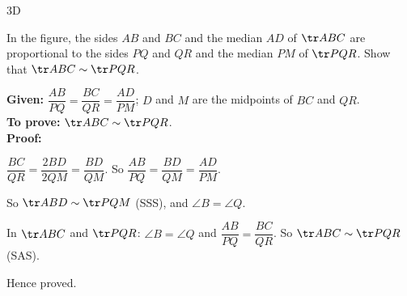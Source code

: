 \begin{exercise}{3D}
\item In the figure, the sides $AB$ and $BC$ and the median $AD$ of $\tr ABC$ are proportional to the sides $PQ$ and $QR$ and the median $PM$ of $\tr PQR$. Show that $\tr ABC\sim\tr PQR$.
\begin{solution}
\textbf{Given:} $\dfrac{AB}{PQ}=\dfrac{BC}{QR}=\dfrac{AD}{PM}$; $D$ and $M$ are the midpoints of $BC$ and $QR$.\\
\textbf{To prove:} $\tr ABC\sim\tr PQR$.\\
\textbf{Proof:}
\begin{steps}
  \item $\dfrac{BC}{QR}=\dfrac{2BD}{2QM}=\dfrac{BD}{QM}$. So $\dfrac{AB}{PQ}=\dfrac{BD}{QM}=\dfrac{AD}{PM}$.
  \item So $\tr ABD\sim\tr PQM$ (SSS), and $\angle B=\angle Q$.
  \item In $\tr ABC$ and $\tr PQR$: $\angle B=\angle Q$ and $\dfrac{AB}{PQ}=\dfrac{BC}{QR}$. So $\tr ABC\sim\tr PQR$ (SAS).
\end{steps}
Hence proved.
\end{solution}


\end{exercise}
